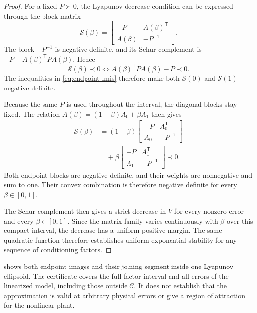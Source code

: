 \documentclass[pdflatex,iicol,sn-mathphys-ay]{sn-jnl}
\begin{document}
\begin{proof}
For a fixed $P\succ0$, the Lyapunov decrease condition can be expressed through the block matrix
\begin{equation}
    \mathcal S(\beta)=
    \begin{bmatrix}
        -P&A(\beta)^{\mathsf T}\\
        A(\beta)&-P^{-1}
    \end{bmatrix}.
    \label{eq:schur-block}
\end{equation}
The block $-P^{-1}$ is negative definite, and its Schur complement is $-P+A(\beta)^{\mathsf T}PA(\beta)$. Hence
\[
    \mathcal S(\beta)\prec0
    \Longleftrightarrow
    A(\beta)^{\mathsf T}PA(\beta)-P\prec0.
\]
The inequalities in \eqref{eq:endpoint-lmis} therefore make both $\mathcal S(0)$ and $\mathcal S(1)$ negative definite.

Because the same $P$ is used throughout the interval, the diagonal blocks stay fixed. The relation $A(\beta)=(1-\beta)A_0+\beta A_1$ then gives
\begin{equation}
\begin{aligned}
    \mathcal S(\beta)
    &=(1-\beta)\begin{bmatrix}
        -P&A_0^{\mathsf T}\\
        A_0&-P^{-1}
    \end{bmatrix}\\
    &\quad+\beta\begin{bmatrix}
        -P&A_1^{\mathsf T}\\
        A_1&-P^{-1}
    \end{bmatrix}\prec0.
\end{aligned}
\label{eq:schur-convex-combination}
\end{equation}
Both endpoint blocks are negative definite, and their weights are nonnegative and sum to one. Their convex combination is therefore negative definite for every $\beta\in[0,1]$.

The Schur complement then gives a strict decrease in $V$ for every nonzero error and every $\beta\in[0,1]$. Since the matrix family varies continuously with $\beta$ over this compact interval, the decrease has a uniform positive margin. The same quadratic function therefore establishes uniform exponential stability for any sequence of conditioning factors.
\end{proof}

 shows both endpoint images and their joining segment inside one Lyapunov ellipsoid. The certificate covers the full factor interval and all errors of the linearized model, including those outside $\mathcal C$. It does not establish that the approximation is valid at arbitrary physical errors or give a region of attraction for the nonlinear plant.
\end{document}
